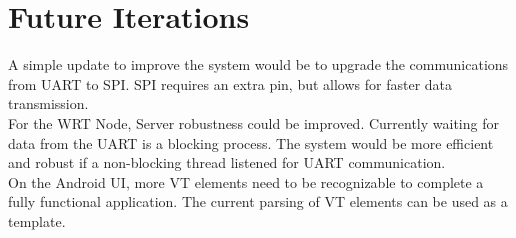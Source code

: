 \documentclass[paper=a4, fontsize=11pt]{scrartcl}
\numberwithin{equation}{section}		%
\numberwithin{figure}{section}			%
\numberwithin{table}{section}				%
\begin{document}
\section{Future Iterations}
A simple update to improve the system would be to upgrade the communications from UART to SPI. SPI requires an extra pin, but allows for faster data transmission. \\

For the WRT Node, Server robustness could be improved. Currently waiting for data from the UART is a blocking process. The system would be more efficient and robust if a non-blocking thread listened for UART communication. \\

On the Android UI, more VT elements need to be recognizable to complete a fully functional application. The current parsing of VT elements can be used as a template.\\
\end{document}
